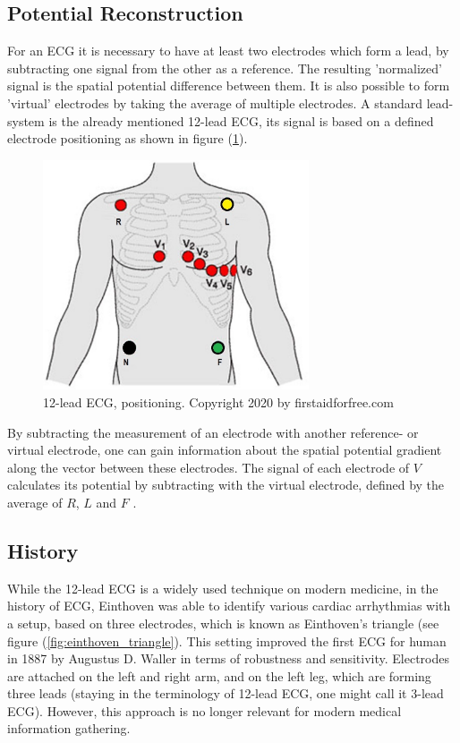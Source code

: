 \subsection{Potential Reconstruction}\label{cap:potential_reconstruction}
For an ECG it is necessary to have at least two electrodes which form a lead, by subtracting one signal from the other as a reference. The resulting 'normalized' signal is the spatial potential difference between them. It is also possible to form 'virtual' electrodes by taking the average of multiple electrodes. A standard lead-system is the already mentioned 12-lead ECG, its signal is based on a defined electrode positioning as shown in figure (\ref{fig:12-lead-ecg}).

\begin{figure}[ht]
    \center
    \includegraphics[width=0.7\textwidth]{figures/ecg_12_lead.png}
	\caption{12-lead ECG, positioning. Copyright 2020 by firstaidforfree.com}
	\label{fig:12-lead-ecg}
\end{figure}
By subtracting the measurement of an electrode with another reference- or virtual electrode, one can gain information about the spatial potential gradient along the vector between these electrodes. The signal of each electrode of $V$ calculates its potential by subtracting with the virtual electrode, defined by the average of $R$, $L$ and $F$ \cite{12lead_ecg}.

\subsection{History}
While the 12-lead ECG is a widely used technique on modern medicine, in the history of ECG, Einthoven was able to identify various cardiac arrhythmias with a setup, based on three electrodes, which is known as Einthoven's triangle\cite{conover_understanding_2003} (see figure (\ref{fig:einthoven_triangle}).
This setting improved the first ECG for human in 1887 by Augustus D. Waller \cite{waller_1887} in terms of robustness and sensitivity. Electrodes are attached on the left and right arm, and on the left leg, which are forming three leads (staying in the terminology of 12-lead ECG, one might call it 3-lead ECG). However, this approach is no longer relevant for modern medical information gathering.

